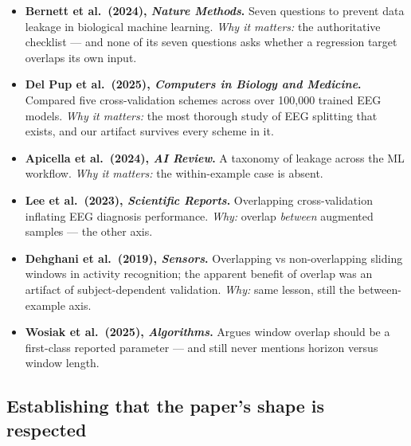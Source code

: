 \documentclass[11pt]{article}
\begin{document}
\begin{itemize}
\item \textbf{Bernett et al.\ (2024), \emph{Nature Methods}.} Seven questions to
prevent data leakage in biological machine learning. \emph{Why it matters:} the
authoritative checklist --- and none of its seven questions asks whether a
regression target overlaps its own input.
\item \textbf{Del Pup et al.\ (2025), \emph{Computers in Biology and Medicine}.}
Compared five cross-validation schemes across over 100{,}000 trained EEG models.
\emph{Why it matters:} the most thorough study of EEG splitting that exists, and
our artifact survives every scheme in it.
\item \textbf{Apicella et al.\ (2024), \emph{AI Review}.} A taxonomy of leakage
across the ML workflow. \emph{Why it matters:} the within-example case is absent.
\item \textbf{Lee et al.\ (2023), \emph{Scientific Reports}.} Overlapping
cross-validation inflating EEG diagnosis performance. \emph{Why:} overlap
\emph{between} augmented samples --- the other axis.
\item \textbf{Dehghani et al.\ (2019), \emph{Sensors}.} Overlapping vs
non-overlapping sliding windows in activity recognition; the apparent benefit of
overlap was an artifact of subject-dependent validation. \emph{Why:} same lesson,
still the between-example axis.
\item \textbf{Wosiak et al.\ (2025), \emph{Algorithms}.} Argues window overlap
should be a first-class reported parameter --- and still never mentions horizon
versus window length.
\end{itemize}

\subsection{Establishing that the paper's shape is respected}
\end{document}
